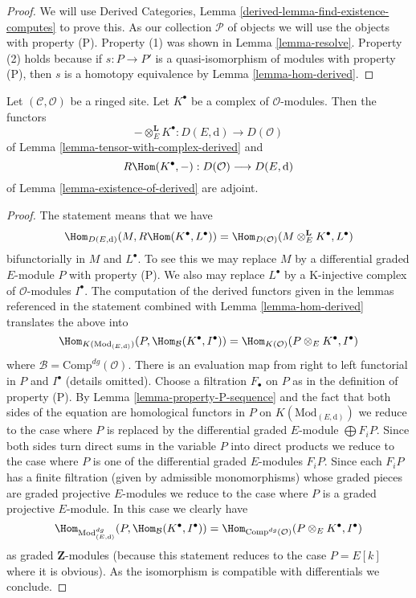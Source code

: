 \begin{proof}
We will use
Derived Categories, Lemma \ref{derived-lemma-find-existence-computes}
to prove this. As our collection $\mathcal{P}$
of objects we will use the objects with property (P).
Property (1) was shown in Lemma \ref{lemma-resolve}.
Property (2) holds because if $s : P \to P'$ is a quasi-isomorphism
of modules with property (P), then $s$ is a homotopy equivalence
by Lemma \ref{lemma-hom-derived}.
\end{proof}

\begin{lemma}
\label{lemma-tensor-with-complex-hom-adjoint}
Let $(\mathcal{C}, \mathcal{O})$ be a ringed site.
Let $K^\bullet$ be a complex of $\mathcal{O}$-modules.
Then the functors
$$
- \otimes_E^\mathbf{L} K^\bullet :
D(E, \text{d})
\longrightarrow
D(\mathcal{O})
$$
of Lemma \ref{lemma-tensor-with-complex-derived} and
$$
R\Hom(K^\bullet, -) : D(\mathcal{O}) \longrightarrow D(E, \text{d})
$$
of Lemma \ref{lemma-existence-of-derived} are adjoint.
\end{lemma}

\begin{proof}
The statement means that we have
$$
\Hom_{D(E, \text{d})}(M, R\Hom(K^\bullet, L^\bullet)) =
\Hom_{D(\mathcal{O})}(M \otimes^\mathbf{L}_E K^\bullet, L^\bullet)
$$
bifunctorially in $M$ and $L^\bullet$. To see this we may replace $M$
by a differential graded $E$-module $P$ with property (P).
We also may replace $L^\bullet$ by a K-injective complex of
$\mathcal{O}$-modules $I^\bullet$. The computation
of the derived functors given in the lemmas referenced in the statement
combined with Lemma \ref{lemma-hom-derived} translates the above into
$$
\Hom_{K(\text{Mod}_{(E, \text{d})})}
(P, \Hom_\mathcal{B}(K^\bullet, I^\bullet)) =
\Hom_{K(\mathcal{O})}(P \otimes_E K^\bullet, I^\bullet)
$$
where $\mathcal{B} = \text{Comp}^{dg}(\mathcal{O})$. 
There is an evaluation map from right to left functorial
in $P$ and $I^\bullet$ (details omitted).
Choose a filtration $F_\bullet$ on $P$ as in the definition of property (P).
By Lemma \ref{lemma-property-P-sequence} and the fact that
both sides of the equation are homological functors in $P$
on $K(\text{Mod}_{(E, \text{d})})$
we reduce to the case where $P$ is replaced by
the differential graded $E$-module $\bigoplus F_iP$.
Since both sides turn direct sums in the variable $P$
into direct products we reduce to the case where $P$ is one of the
differential graded $E$-modules $F_iP$.
Since each $F_iP$ has a finite filtration (given by admissible
monomorphisms) whose graded pieces are graded projective $E$-modules
we reduce to the case where $P$ is a graded projective $E$-module.
In this case we clearly have
$$
\Hom_{\text{Mod}^{dg}_{(E, \text{d})}}
(P, \Hom_\mathcal{B}(K^\bullet, I^\bullet)) =
\Hom_{\text{Comp}^{dg}(\mathcal{O})}(P \otimes_E K^\bullet, I^\bullet)
$$
as graded $\mathbf{Z}$-modules (because this statement reduces to the case
$P = E[k]$ where it is obvious). As the isomorphism is compatible with
differentials we conclude.
\end{proof}

